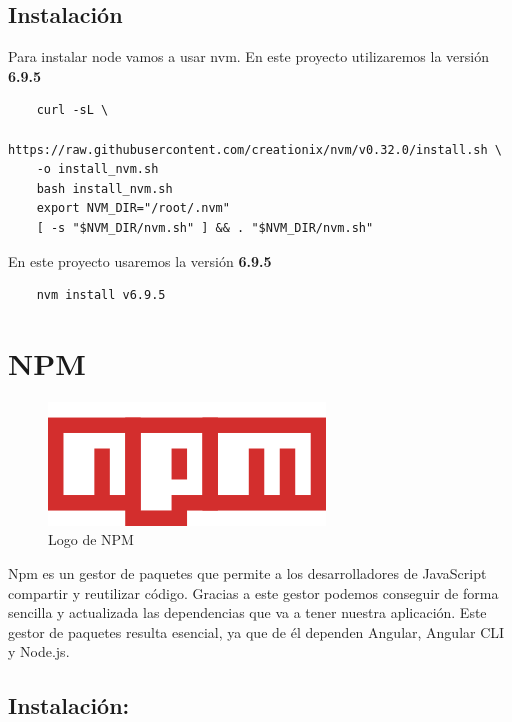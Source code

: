 \documentclass[openright,twoside,10pt]{book}
\begin{document}
    \subsection{Instalación}\label{instalaciuxf3n}
    
    Para instalar node vamos a usar nvm. En este proyecto utilizaremos la
    versión \textbf{6.9.5}
    
    \begin{verbatim}
    curl -sL \
    https://raw.githubusercontent.com/creationix/nvm/v0.32.0/install.sh \
    -o install_nvm.sh
    bash install_nvm.sh
    export NVM_DIR="/root/.nvm"
    [ -s "$NVM_DIR/nvm.sh" ] && . "$NVM_DIR/nvm.sh"
    \end{verbatim}
    
    En este proyecto usaremos la versión \textbf{6.9.5}
    
    \begin{verbatim}
    nvm install v6.9.5
    \end{verbatim}
    
    \newpage
    
    \section{NPM}\label{npm}
    
    \begin{figure}[H]
        \begin{center}
            \includegraphics[scale=0.8]{img/npm.png}
        \end{center}
        \caption{Logo de NPM}
    \end{figure}
    
    Npm es un gestor de paquetes que permite a los desarrolladores de
    JavaScript compartir y reutilizar código. Gracias a este gestor podemos
    conseguir de forma sencilla y actualizada las dependencias que va a
    tener nuestra aplicación. Este gestor de paquetes resulta esencial, ya
    que de él dependen Angular, Angular CLI y Node.js.
    
    \subsection{Instalación:}\label{instalaciuxf3n-1}
    
\end{document}
